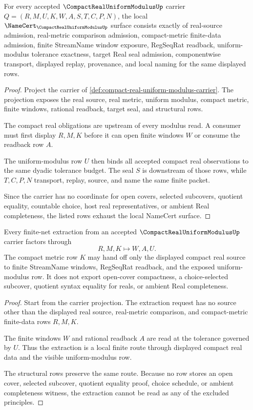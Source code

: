 \begin{theorem}
\label{thm:compact-real-uniform-modulus-namecert-obligations}
For every accepted $\CompactRealUniformModulusUp$ carrier $Q=(R,M,U,K,W,A,S,T,C,P,N)$, the local $\NameCert_{\CompactRealUniformModulusUp}$ surface consists exactly of real-source admission, real-metric comparison admission, compact-metric finite-data admission, finite StreamName window exposure, RegSeqRat readback, uniform-modulus tolerance exactness, target Real seal admission, componentwise transport, displayed replay, provenance, and local naming for the same displayed rows.
\end{theorem}
\begin{proof}
Project the carrier of \autoref{def:compact-real-uniform-modulus-carrier}. The projection exposes the real source, real metric, uniform modulus, compact metric, finite windows, rational readback, target seal, and structural rows.

The compact real obligations are upstream of every modulus read. A consumer must first display $R,M,K$ before it can open finite windows $W$ or consume the readback row $A$.

The uniform-modulus row $U$ then binds all accepted compact real observations to the same dyadic tolerance budget. The seal $S$ is downstream of those rows, while $T,C,P,N$ transport, replay, source, and name the same finite packet.

Since the carrier has no coordinate for open covers, selected subcovers, quotient equality, countable choice, host real representatives, or ambient Real completeness, the listed rows exhaust the local NameCert surface.
\end{proof}

\begin{theorem}
\label{thm:compact-real-uniform-modulus-finite-net-extraction}
Every finite-net extraction from an accepted $\CompactRealUniformModulusUp$ carrier factors through
$$
R,M,K \longmapsto W,A,U .
$$
The compact metric row $K$ may hand off only the displayed compact real source to finite StreamName windows, RegSeqRat readback, and the exposed uniform-modulus row. It does not export open-cover compactness, a choice-selected subcover, quotient syntax equality for reals, or ambient Real completeness.
\end{theorem}
\begin{proof}
Start from the carrier projection. The extraction request has no source other than the displayed real source, real-metric comparison, and compact-metric finite-data rows $R,M,K$.

The finite windows $W$ and rational readback $A$ are read at the tolerance governed by $U$. Thus the extraction is a local finite route through displayed compact real data and the visible uniform-modulus row.

The structural rows preserve the same route. Because no row stores an open cover, selected subcover, quotient equality proof, choice schedule, or ambient completeness witness, the extraction cannot be read as any of the excluded principles.
\end{proof}

